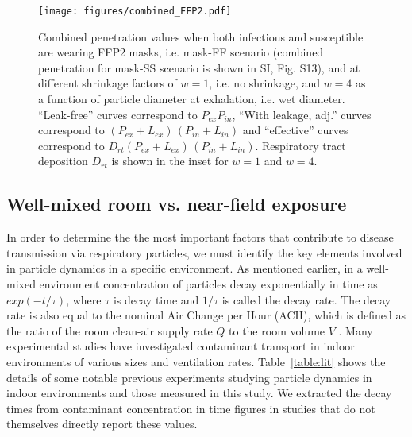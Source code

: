 \documentclass[preprint]{elsarticle}
\begin{document}
\begin{figure}[htbp]
	\centering
	\texttt{[image: figures/combined\_FFP2.pdf]}
	\caption{Combined penetration values when both infectious and susceptible are wearing FFP2 masks, i.e. mask-FF scenario (combined penetration for mask-SS scenario is shown in SI, Fig. S13), and at different shrinkage factors of $w = 1$, i.e. no shrinkage, and $w = 4$ as a function of particle diameter at exhalation, i.e. wet diameter. \enquote{Leak-free} curves correspond to $P_{ex} P_{in}$, \enquote{With leakage, adj.}
	curves correspond to $\left(P_{ex}+L_{ex}\right)\,\left(P_{in}+L_{in}\right)$ and \enquote{effective} curves correspond to $D_{rt}\left(P_{ex}+L_{ex}\right)\,\left(P_{in}+L_{in}\right)$. Respiratory tract deposition $D_{rt}$ is shown in the inset for $w=1$ and $w=4$.}
	\label{fig:effective_penetration}
\end{figure}


\subsection{Well-mixed room vs. near-field exposure}

In order to determine the the most important factors that contribute to disease transmission via respiratory particles, we must identify the key elements involved in particle dynamics in a specific environment. 
As mentioned earlier, in a well-mixed environment concentration of particles decay exponentially in time as $exp(-t/\tau)$, where $\tau$ is decay time and $1/\tau$ is called the decay rate. 
The decay rate is also equal to the nominal Air Change per Hour (ACH), which is defined as the ratio of the room clean-air supply rate $Q$ to the room volume $V$ \cite{Nicas_1996}. 
Many experimental studies have investigated contaminant transport in indoor environments of various sizes and ventilation rates.
Table~\ref{table:lit} shows the details of some notable previous experiments studying particle dynamics in indoor environments and those measured in this study.
We extracted the decay times from contaminant concentration in time figures in studies that do not themselves directly report these values.
\end{document}
